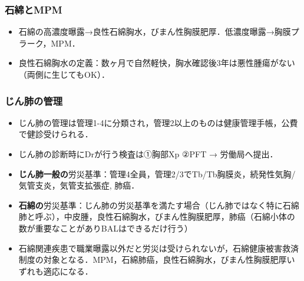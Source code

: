 \subsubsection{石綿とMPM}
\begin{itemize}
\item 石綿の高濃度曝露→良性石綿胸水，びまん性胸膜肥厚．低濃度曝露→胸膜プラーク，MPM．
\item 良性石綿胸水の定義：数ヶ月で自然軽快，胸水確認後3年は悪性腫瘍がない（両側に生じてもOK）．

\end{itemize}


\subsubsection{じん肺の管理}
\begin{itemize}
\item じん肺の管理は管理1-4に分類され，管理2以上のものは健康管理手帳，公費で健診受けられる．
\item じん肺の診断時にDrが行う検査は①胸部Xp ②PFT → 労働局へ提出．
\item \textbf{じん肺一般の}労災基準：管理4全員，管理2/3でTb/Tb胸膜炎，続発性気胸/気管支炎，気管支拡張症, 肺癌．

\item \textbf{石綿の}労災基準：じん肺の労災基準を満たす場合（じん肺ではなく特に石綿肺と呼ぶ），中皮腫，良性石綿胸水，びまん性胸膜肥厚，肺癌（石綿小体の数が重要なことがありBALはできるだけ行う）

\item 石綿関連疾患で職業曝露以外だと労災は受けられないが，石綿健康被害救済制度の対象となる．MPM，石綿肺癌，良性石綿胸水，びまん性胸膜肥厚いずれも適応になる．


\end{itemize}
